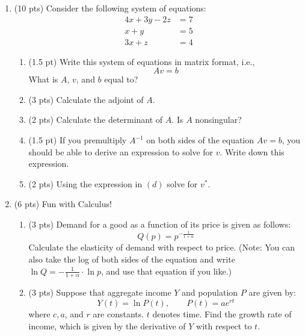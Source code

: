 \documentclass{./../../../Latex/tests}
\begin{document}
\begin{enumerate}
\newpage
\item (10 pts) Consider the following system of equations:
\begin{align*}
4 x + 3y -2z & = 7 \\
x+y & = 5 \\
3x+z &= 4	
\end{align*}
\begin{enumerate}
  \item (1.5 pt) Write this system of equations in matrix format, i.e., $$ Av=b $$
  What is $A$, $v$, and $b$ equal to?
  \vspace{5.5cm}
   \item (3 pts) Calculate the adjoint of $A$. 
  \newpage
  \item (2 pts) Calculate the determinant of $A$. Is $A$ nonsingular?
  \vspace{6.5cm}
  \item (1.5 pt) If you premultiply $A^{-1}$ on both sides of the equation $ Av=b $, you should be able to derive an expression to solve for $v$. Write down this expression. 
  \vspace{3.5cm}
  \item (2 pts) Using the expression in $(d)$ solve for $v^*$. 
\end{enumerate}


\newpage
\item (6 pts) Fun with Calculus!
\begin{enumerate}
\item (3 pts) Demand for a good as a function of its price is given as follows:
$$ Q(p) = p^{-\frac{1}{1+\alpha}}  $$
Calculate the elasticity of demand with respect to price. (Note: You can also take the log of both sides of the equation and write $\ln Q = -\frac{1}{1+\alpha} \cdot \ln p$, and use that equation if you like.)
\vspace{7cm}
\item (3 pts) Suppose that aggregate income $Y$ and population $P$ are given by:
$$Y(t) = \ln P(t), \quad \quad P(t) = ae^{rt}$$ 
where $c, a$, and $r$ are constants. $t$ denotes time. Find the growth rate of income, which is given by the derivative of $Y$ with respect to $t$.
\end{enumerate}


\end{enumerate}
\end{document}
